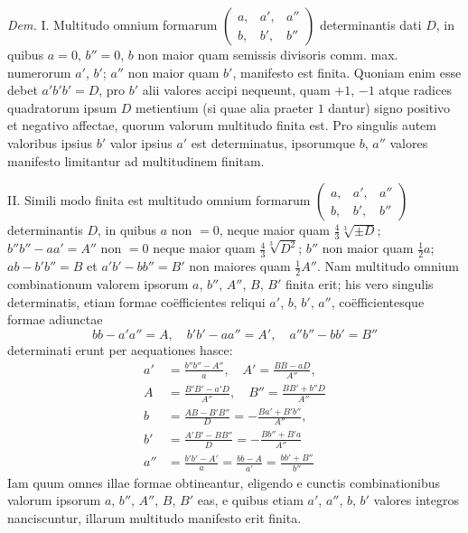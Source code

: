 \emph{Dem.} I. Multitudo omnium formarum \(\left(\begin{smallmatrix}a,&a',&a''\\b,&b',&b''\end{smallmatrix}\right)\) determinantis dati \(D\), in quibus \(a=0\), \(b''=0\), \(b\) non maior quam semissis divisoris comm. max. numerorum \(a'\), \(b'\); \(a''\) non maior quam \(b'\), manifesto est finita. Quoniam enim esse debet \(a'b'b'=D\), pro \(b'\) alii valores accipi nequeunt, quam \(+1\), \(-1\) atque radices quadratorum ipsum \(D\) metientium (si quae alia praeter \(1\) dantur) signo positivo et negativo affectae, quorum valorum multitudo finita est. Pro singulis autem valoribus ipsius \(b'\) valor ipsius \(a'\) est determinatus, ipsorumque \(b\), \(a''\) valores manifesto limitantur ad multitudinem finitam.

II. Simili modo finita est multitudo omnium formarum \(\left(\begin{smallmatrix}a,&a',&a''\\b,&b',&b''\end{smallmatrix}\right)\) determinantis \(D\), in quibus \(a\) non \(=0\), neque maior quam \(\frac{4}{3}\sqrt[3]{\pm D}\); \(b''b''-aa'=A''\) non \(=0\) neque maior quam \(\frac{4}{3}\sqrt[3]{D^2}\); \(b''\) non maior quam \(\frac{1}{2}a\); \(ab-b'b''=B\) et \(a'b'-bb''=B'\) non maiores quam \(\frac{1}{2}A''\). Nam multitudo omnium combinationum valorem ipsorum \(a\), \(b''\), \(A''\), \(B\), \(B'\) finita erit; his vero singulis determinatis, etiam formae co\"efficientes reliqui \(a'\), \(b\), \(b'\), \(a''\), co\"efficientesque formae adiunctae
\[
bb-a'a''=A,\quad b'b'-aa''=A',\quad a''b''-bb'=B''
\]
determinati erunt per aequationes hasce:
\[
\begin{aligned}
a'&=\frac{b''b''-A''}{a},\quad A'=\frac{BB-aD}{A''},\\
A&=\frac{B'B'-a'D}{A''},\quad B''=\frac{BB'+b''D}{A''}\\
b&=\frac{AB-B'B''}{D}=-\frac{Ba'+B'b''}{A''},\\
b'&=\frac{A'B'-BB''}{D}=-\frac{Bb''+B'a}{A''}\\
a''&=\frac{b'b'-A'}{a}=\frac{bb-A}{a'}=\frac{bb'+B''}{b''}
\end{aligned}
\]
Iam quum omnes illae formae obtineantur, eligendo e cunctis combinationibus valorum ipsorum \(a\), \(b''\), \(A''\), \(B\), \(B'\) eas, e quibus etiam \(a'\), \(a''\), \(b\), \(b'\) valores integros nanciscuntur, illarum multitudo manifesto erit finita.


